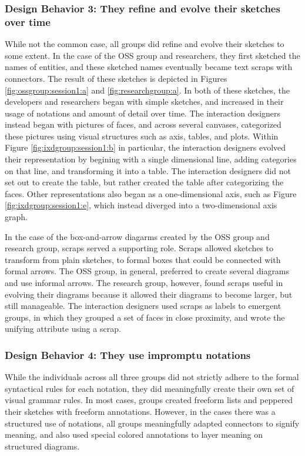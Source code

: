 \subsubsection{Design Behavior 3: They refine and evolve their sketches over time}

While not the common case, all groups did refine and evolve their sketches to some extent. In the case of the OSS group and researchers, they first sketched the names of entities, and these sketched names eventually became text scraps with connectors. The result of these sketches is depicted in Figures \ref{fig:ossgroup:session1:a} and \ref{fig:researchgroup:a}. In both of these sketches, the developers and researchers began with simple sketches, and increased in their usage of notations and amount of detail over time. The interaction designers instead began with pictures of faces, and across several canvases, categorized these pictures using visual structures such as axis, tables, and plots. Within Figure \ref{fig:ixdgroup:session1:b} in particular, the interaction designers evolved their representation by begining with a single dimensional line, adding categories on that line, and transforming it into a table. The interaction designers did not set out to create the table, but rather created the table after categorizing the faces. Other representations also began as a one-dimensional axis, such as Figure \ref{fig:ixdgroup:session1:e}, which instead diverged into a two-dimensional axis graph.

In the case of the box-and-arrow diagarms created by the OSS group and research group, scraps served a supporting role. Scraps allowed sketches to transform from plain sketches, to formal boxes that could be connected with formal arrows. The OSS group, in general, preferred to create several diagrams and use informal arrows. The research group, however, found scraps useful in evolving their diagrams because it allowed their diagrams to become larger, but still manageable. The interaction designers used scraps as labels to emergent groups, in which they grouped a set of faces in close proximity, and wrote the unifying attribute using a scrap.

\subsubsection{Design Behavior 4: They use impromptu notations}

While the individuals across all three groups did not strictly adhere to the formal syntactical rules for each notation, they did meaningfully create their own set of visual grammar rules. In most cases, groups created freeform lists and peppered their sketches with freeform annotations. However, in the cases there was a structured use of notations, all groups meaningfully adapted connectors to signify meaning, and also used special colored annotations to layer meaning on structured diagrams.


